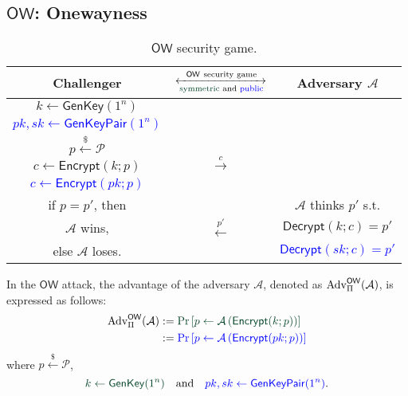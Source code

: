 \documentclass[12pt,openany]{book}
\theoremstyle{definition}
\newcommand{\of}[1]{\left( #1 \right)}
\newcommand{\dollar}{\$}
\newcommand{\uniform}{\xleftarrow{\dollar}}
\newcommand{\A}{\mathcal{A}}
\newcommand{\OW}{\mathsf{OW}}
\newcommand{\Adv}{\textnormal{Adv}}
\newcommand{\GenKey}{\mathsf{GenKey}}
\newcommand{\GenKeyPair}{\mathsf{GenKeyPair}}
\newcommand{\Encrypt}{\mathsf{Encrypt}}
\newcommand{\Decrypt}{\mathsf{Decrypt}}
\begin{document}
	\subsection{$\OW$: Onewayness}
	\begin{table}[h]
		\centering\begin{tabular}{ccc}
			\toprule[1.5pt]
			Challenger & $\xleftrightarrow[\textnormal{\textcolor{britishracinggreen}{symmetric} and \textcolor{blue}{public}}]{\OW\ \textnormal{security game}}$ & Adversary $\mathcal{A}$\\
			\midrule
			\textcolor{britishracinggreen}{$k\gets\GenKey(1^n)$}\\
			\textcolor{blue}{$pk, sk\gets\GenKeyPair(1^n)$}\\
			\midrule
			$p\uniform\mathcal{P}$ & \multirow{3}{*}{$\xrightarrow{c}$} \\
			\textcolor{britishracinggreen}{$c\gets\Encrypt(k;p)$}\\
			\textcolor{blue}{$c\gets\Encrypt(pk;p)$}\\
			\midrule
			if $p=p'$, then & \multirow{3}{*}{$\xleftarrow{p'}$} & $\A$ thinks $p'$ s.t.\\
			$\mathcal{A}$ wins, & & \textcolor{britishracinggreen}{$\Decrypt(k;c)=p'$}\\
			else $\mathcal{A}$ loses. & & \textcolor{blue}{$\Decrypt(sk;c)=p'$} \\
			\bottomrule[1.5pt]
		\end{tabular}
		\caption{$\OW$ security game.}
	\end{table}
	In the $\OW$ attack, the advantage of the adversary $\A$, denoted as $\Adv_{\Pi}^{\OW}(\A)$, is expressed as follows: \begin{align*}
	\Adv_{\Pi}^{\OW}(\A)&:=\textcolor{britishracinggreen}{\Pr\left[p\gets\A\of{\Encrypt(k;p)}\right]}\\
	&:=\textcolor{blue}{\Pr\left[p\gets\A\of{\Encrypt(pk;p)}\right]}
	\end{align*} where $p\uniform\mathcal{P}$, \[
	\textcolor{britishracinggreen}{k\gets\GenKey(1^n)}\quad\text{and}\quad\textcolor{blue}{pk,sk\gets\GenKeyPair(1^n)}.
	\]
	
	\newpage
\end{document}

